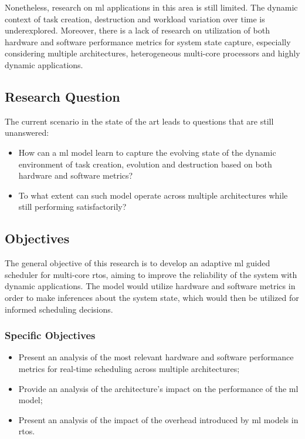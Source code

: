 \documentclass[journal,onecolumn]{IEEEtran}
\begin{document}
Nonetheless, research on \gls{ml} applications in this area is still limited. The dynamic context of task creation, destruction and workload variation over time is underexplored. Moreover, there is a lack of research on utilization of both hardware and software performance metrics for system state capture, especially considering multiple architectures, heterogeneous multi-core processors and highly dynamic applications.

\subsection{Research Question}

The current scenario in the state of the art leads to questions that are still unanswered:

\begin{itemize}
    \item How can a \gls{ml} model learn to capture the evolving state of the dynamic environment of task creation, evolution and destruction based on both hardware and software metrics?
    \item To what extent can such model operate across multiple architectures while still performing satisfactorily?
\end{itemize}

\subsection{Objectives}

The general objective of this research is to develop an adaptive \gls{ml} guided scheduler for multi-core \gls{rtos}, aiming to improve the reliability of the system with dynamic applications. The model would utilize hardware and software metrics in order to make inferences about the system state, which would then be utilized for informed scheduling decisions.

\subsubsection{Specific Objectives}

\begin{itemize}
    \item Present an analysis of the most relevant hardware and software performance metrics for real-time scheduling across multiple architectures;
    \item Provide an analysis of the architecture's impact on the performance of the \gls{ml} model;
	\item Present an analysis of the impact of the overhead introduced by \gls{ml} models in \gls{rtos}.
\end{itemize}
\end{document}
